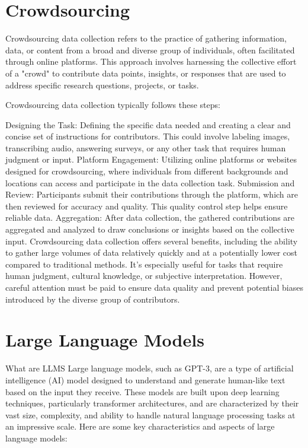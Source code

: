 \section{Crowdsourcing}
Crowdsourcing data collection refers to the practice of gathering information, data, or content from a broad and diverse group of individuals, often facilitated through online platforms. This approach involves harnessing the collective effort of a "crowd" to contribute data points, insights, or responses that are used to address specific research questions, projects, or tasks.

Crowdsourcing data collection typically follows these steps:

Designing the Task: Defining the specific data needed and creating a clear and concise set of instructions for contributors. This could involve labeling images, transcribing audio, answering surveys, or any other task that requires human judgment or input.
Platform Engagement: Utilizing online platforms or websites designed for crowdsourcing, where individuals from different backgrounds and locations can access and participate in the data collection task.
Submission and Review: Participants submit their contributions through the platform, which are then reviewed for accuracy and quality. This quality control step helps ensure reliable data.
Aggregation: After data collection, the gathered contributions are aggregated and analyzed to draw conclusions or insights based on the collective input.
Crowdsourcing data collection offers several benefits, including the ability to gather large volumes of data relatively quickly and at a potentially lower cost compared to traditional methods. It's especially useful for tasks that require human judgment, cultural knowledge, or subjective interpretation. However, careful attention must be paid to ensure data quality and prevent potential biases introduced by the diverse group of contributors.
\section{Large Language Models}
What are LLMS
Large language models, such as GPT-3, are a type of artificial intelligence (AI) model designed to understand and generate human-like text based on the input they receive. These models are built upon deep learning techniques, particularly transformer architectures, and are characterized by their vast size, complexity, and ability to handle natural language processing tasks at an impressive scale. Here are some key characteristics and aspects of large language models:

